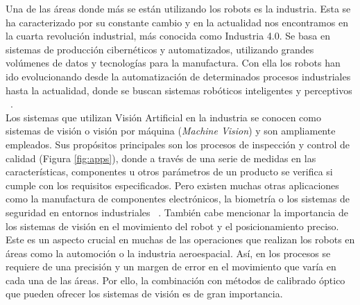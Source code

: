 \documentclass{bmvc2k}
\begin{document}
Una de las áreas donde más se están utilizando los robots es la industria. Esta se ha caracterizado por su constante cambio y en la actualidad nos encontramos en la cuarta revolución industrial, más conocida como Industria 4.0. Se basa en sistemas de producción cibernéticos y automatizados, utilizando grandes volúmenes de datos y tecnologías para la manufactura. Con ella los robots han ido evolucionando desde la automatización de determinados procesos industriales hasta la actualidad, donde se buscan sistemas robóticos inteligentes y perceptivos ~\cite{perez2016robot}.\\
Los sistemas que utilizan Visión Artificial en la industria se conocen como sistemas de visión o visión por máquina (\textit{Machine Vision}) y son ampliamente empleados. Sus propósitos principales son los procesos de inspección y control de calidad (Figura \ref{fig:apps}), donde a través de una serie de medidas en las características, componentes u otros parámetros de un producto se verifica si cumple con los requisitos especificados. Pero existen muchas otras aplicaciones como la manufactura de componentes electrónicos, la biometría o los sistemas de seguridad en entornos industriales ~\cite{labudzki2014essence}. También cabe mencionar la importancia de los sistemas de visión en el movimiento del robot y el posicionamiento preciso. Este es un aspecto crucial en muchas de las operaciones que realizan los robots en áreas como la automoción o la industria aeroespacial. Así, en los procesos se requiere de una precisión y un margen de error en el movimiento que varía en cada una de las áreas. Por ello, la combinación con métodos de calibrado óptico que pueden ofrecer los sistemas de visión es de gran importancia.
\end{document}
